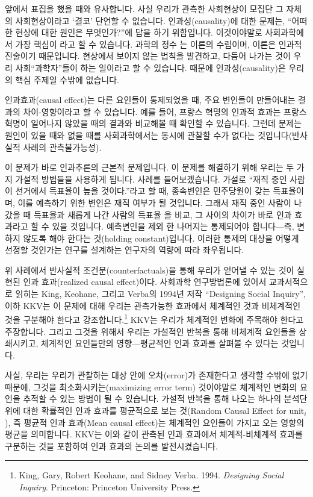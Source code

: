 \documentclass[]{book}
\let\rmarkdownfootnote\footnote%
\def\footnote{\protect\rmarkdownfootnote}
\begin{document}
앞에서 표집을 했을 때와 유사합니다. 사실 우리가 관측한 사회현상이 모집단 그 자체의 사회현상이라고 `결코' 단언할 수 없습니다. 인과성(causality)에 대한 문제는, ``어떠한 현상에 대한 원인은 무엇인가?''에 답을 하기 위함입니다. 이것이야말로 사회과학에서 가장 핵심이
라고 할 수 있습니다. 과학의 정수 는 이론의 수립이며, 이론은 인과적 진술이기 때문입니다. 현상에서 보이지 않는 법칙을 발견하고, 다듬어 나가는 것이 우리 사회``과학자''들이 하는 일이라고 할 수 있습니다. 때문에 인과성(causality)은 우리의 핵심 주제일 수밖에 없습니다.

인과효과(causal effect)는 다른 요인들이 통제되었을 때, 주요 변인들이 만들어내는 결과의 차이-영향이라고 할 수 있습니다. 예를 들어, 프랑스 혁명의 인과적 효과는 프랑스 혁명이 일어나지 않았을 때의 결과와 비교해볼 때 확인할 수 있습니다. 그런데 문제는 원인이 있을 때와 없을 때를 사회과학에서는 동시에 관찰할 수가 없다는 것입니다(반사실적 사례의 관측불가능성).

이 문제가 바로 인과추론의 근본적 문제입니다. 이 문제를 해결하기 위해 우리는 두 가지 가설적 방법들을 사용하게 됩니다. 사례를 들어보겠습니다. 가설로 ``재직 중인 사람이 선거에서 득표율이 높을 것이다.''라고 할 때, 종속변인은 민주당원이 갖는 득표율이며, 이를 예측하기 위한 변인은 재직 여부가 될 것입니다. 그래서 재직 중인 사람이 나갔을 때 득표율과 새롭게 나간 사람의 득표율
을 비교, 그 사이의 차이가 바로 인과 효과라고 할 수 있을 것입니다. 예측변인을 제외 한 나머지는 통제되어야 합니다---즉, 변하지 않도록 해야 한다는 것(holding constant)입니다. 이러한 통제의 대상을 어떻게 선정할 것인가는 연구를 설계하는 연구자의 역량에 따라 좌우됩니다.

위 사례에서 반사실적 조건문(counterfactuals)을 통해 우리가 얻어낼 수 있는 것이 실현된 인과 효과(realized causal effect)이다. 사회과학 연구방법론에 있어서 교과서적으로 읽히는 King, Keohane, 그리고 Verba의 1994년 저작 ``Designing Social Inquiry'', 이하 KKV는 이 문제에 대해 우리는 관측가능한 효과에서 체계적인 것과 비체계적인 것을 구분해야 한다고 강조합니다.\footnote{King, Gary, Robert Keohane, and Sidney Verba. 1994. \emph{Designing Social Inquiry}. Princeton: Princeton University Press.} KKV는 우리가 체계적인 변화에 주목해야 한다고 주장합니다. 그리고 그것을 위해서 우리는 가설적인 반복을 통해 비체계적 요인들을 상쇄시키고, 체계적인 요인들만의 영향---평균적인 인과 효과를 살펴볼 수 있다는 것입니다.

사실, 우리는 우리가 관찰하는 대상 안에 오차(error)가 존재한다고 생각할 수밖에 없기 때문에, 그것을 최소화시키는(maximizing error term) 것이야말로 체계적인 변화의 요인을 추적할 수 있는 방법이 될 수 있습니다. 가설적 반복을 통해 나오는 하나의 분석단위에 대한 확률적인 인과 효과를 평균적으로 보는 것(Random Causal Effect for \(\text{unit}_i\)), 즉 평균적 인과 효과(Mean causal effect)는 체계적인 요인들이 가지고 오는 영향의 평균을 의미합니다. KKV는 이와 같이 관측된 인과 효과에서 체계적-비체계적 효과를 구분하는 것을 포함하여 인과 효과의 논의를 발전시켰습니다.
\end{document}
